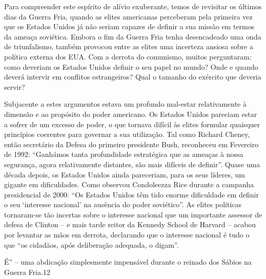  \par 
Para compreender este espírito de alívio exuberante, temos de revisitar os últimos dias da Guerra Fria, quando as elites americanas perceberam pela primeira vez que os Estados Unidos já não seriam capazes de definir a sua missão em termos da ameaça soviética. Embora o fim da Guerra Fria tenha desencadeado uma onda de triunfalismo, também provocou entre as elites uma incerteza ansiosa sobre a política externa dos EUA. Com a derrota do comunismo, muitos perguntaram: como deveriam os Estados Unidos definir o seu papel no mundo? Onde e quando deverá intervir em conflitos estrangeiros? Qual o tamanho do exército que deveria servir?
 \par 
Subjacente a estes argumentos estava um profundo mal-estar relativamente à dimensão e ao propósito do poder americano. Os Estados Unidos pareciam estar a sofrer de um excesso de poder, o que tornava difícil às elites formular quaisquer princípios coerentes para governar a sua utilização. Tal como Richard Cheney, então secretário da Defesa do primeiro presidente Bush, reconheceu em Fevereiro de 1992: “Ganhámos tanta profundidade estratégica que as ameaças à nossa segurança, agora relativamente distantes, são mais difíceis de definir”. Quase uma década depois, os Estados Unidos ainda pareceriam, para os seus líderes, um gigante em dificuldades. Como observou Condoleezza Rice durante a campanha presidencial de 2000: “Os Estados Unidos têm tido enorme dificuldade em definir o seu ‘interesse nacional’ na ausência do poder soviético”. As elites políticas tornaram-se tão incertas sobre o interesse nacional que um importante assessor de defesa de Clinton – e mais tarde reitor da Kennedy School de Harvard – acabou por levantar as mãos em derrota, declarando que o interesse nacional é tudo o que “os cidadãos, após deliberação adequada, o digam”.
 \par 
É” – uma abdicação simplesmente impensável durante o reinado dos Sábios na Guerra Fria.{\color{blue}12}
 \par 
